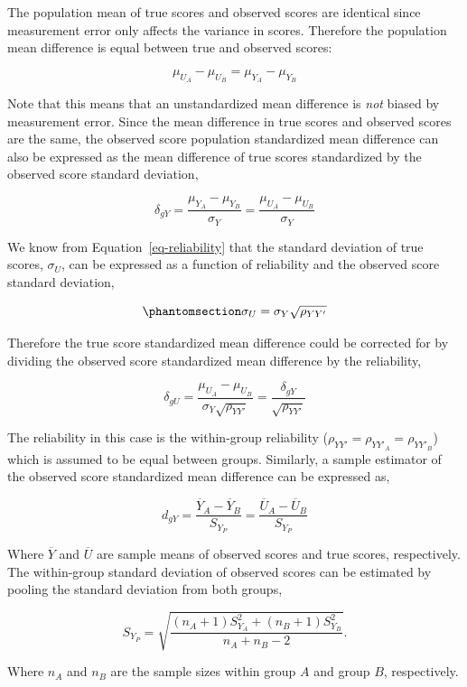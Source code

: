 \documentclass[
  letterpaper,
  DIV=11,
  numbers=noendperiod]{scrreprt}
\begin{document}
The population mean of true scores and observed scores are identical
since measurement error only affects the variance in scores. Therefore
the population mean difference is equal between true and observed
scores:

\[
\mu_{U_A} - \mu_{U_B} = \mu_{Y_A} - \mu_{Y_B}
\]

Note that this means that an unstandardized mean difference is
\emph{not} biased by measurement error. Since the mean difference in
true scores and observed scores are the same, the observed score
population standardized mean difference can also be expressed as the
mean difference of true scores standardized by the observed score
standard deviation,

\[
\delta_{gY} = \frac{\mu_{Y_A} - \mu_{Y_B}}{\sigma_Y}  = \frac{\mu_{U_A} - \mu_{U_B}}{\sigma_Y}
\]

We know from Equation~\ref{eq-reliability} that the standard deviation
of true scores, \(\sigma_U\), can be expressed as a function of
reliability and the observed score standard deviation,

\begin{equation}\phantomsection\label{eq-sd-correction}{
\sigma_U = \sigma_Y\sqrt{\rho_{YY'}}
}\end{equation}

Therefore the true score standardized mean difference could be corrected
for by dividing the observed score standardized mean difference by the
reliability,

\[
\delta_{gU} = \frac{\mu_{U_A} - \mu_{U_B}}{\sigma_Y\sqrt{\rho_{YY'}}} = \frac{\delta_{gY}}{\sqrt{\rho_{YY'}}}
\]

The reliability in this case is the within-group reliability
(\(\rho_{YY'}=\rho_{YY'_A}=\rho_{YY'_B}\)) which is assumed to be equal
between groups. Similarly, a sample estimator of the observed score
standardized mean difference can be expressed as,

\[
d_{gY} = \frac{\overline{Y}_A - \overline{Y}_B}{S_{Y_P}}  = \frac{\overline{U}_A - \overline{U}_B}{S_{Y_P}}
\]

Where \(\overline{Y}\) and \(\overline{U}\) are sample means of observed
scores and true scores, respectively. The within-group standard
deviation of observed scores can be estimated by pooling the standard
deviation from both groups,

\[
S_{Y_P} = \sqrt{\frac{(n_A+1)S^2_{Y_A}+(n_B+1)S^2_{Y_B}}{n_A + n_B - 2}}.
\]

Where \(n_A\) and \(n_B\) are the sample sizes within group \(A\) and
group \(B\), respectively.
\end{document}

